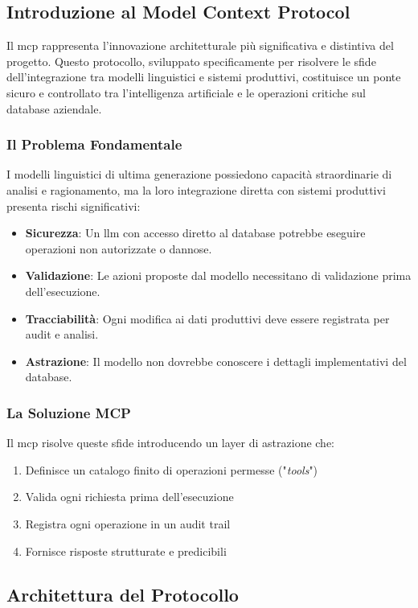 \subsection{Introduzione al Model Context Protocol}
Il \gls{mcp} rappresenta l'innovazione architetturale più significativa e distintiva del progetto. Questo protocollo, sviluppato specificamente per risolvere le sfide dell'integrazione tra modelli linguistici e sistemi produttivi, costituisce un ponte sicuro e controllato tra l'intelligenza artificiale e le operazioni critiche sul database aziendale.

\subsubsection{Il Problema Fondamentale}
I modelli linguistici di ultima generazione possiedono capacità straordinarie di analisi e ragionamento, ma la loro integrazione diretta con sistemi produttivi presenta rischi significativi:
\begin{itemize}
    \item \textbf{Sicurezza}: Un \gls{llm} con accesso diretto al database potrebbe eseguire operazioni non autorizzate o dannose.
    \item \textbf{Validazione}: Le azioni proposte dal modello necessitano di validazione prima dell'esecuzione.
    \item \textbf{Tracciabilità}: Ogni modifica ai dati produttivi deve essere registrata per audit e analisi.
    \item \textbf{Astrazione}: Il modello non dovrebbe conoscere i dettagli implementativi del database.
\end{itemize}

\subsubsection{La Soluzione MCP}
Il \gls{mcp} risolve queste sfide introducendo un layer di astrazione che:
\begin{enumerate}
    \item Definisce un catalogo finito di operazioni permesse ("\textit{tools}")
    \item Valida ogni richiesta prima dell'esecuzione
    \item Registra ogni operazione in un audit trail
    \item Fornisce risposte strutturate e predicibili
\end{enumerate}

\subsection{Architettura del Protocollo}
\label{subsec:mcp_architecture}

